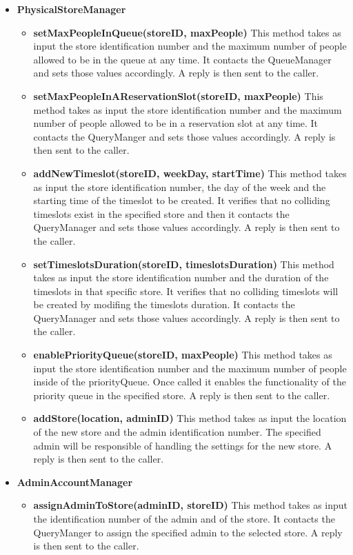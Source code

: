 \begin{itemize}
    \item \textbf{PhysicalStoreManager}
    \begin{itemize}
        \item \textbf{setMaxPeopleInQueue(storeID, maxPeople)}
        This method takes as input the store identification number and the maximum number of people allowed to be in the queue at any time. It contacts the QueueManager and sets those values accordingly. A reply is then sent to the caller. 
        \item \textbf{setMaxPeopleInAReservationSlot(storeID, maxPeople)}
        This method takes as input the store identification number and the maximum number of people allowed to be in a reservation slot at any time. It contacts the QueryManger and sets those values accordingly. A reply is then sent to the caller. 
        \item \textbf{addNewTimeslot(storeID, weekDay, startTime)}
        This method takes as input the store identification number, the day of the week and the starting time of the timeslot to be created. It verifies that no colliding timeslots exist in the specified store and then it contacts the QueryManager and sets those values accordingly. A reply is then sent to the caller.
        \item \textbf{setTimeslotsDuration(storeID, timeslotsDuration)}
        This method takes as input the store identification number and the duration of the timeslots in that specific store. It verifies that no colliding timeslots will be created by modifing the timeslots duration. It contacts the QueryManager and sets those values accordingly. A reply is then sent to the caller.
        \item \textbf{enablePriorityQueue(storeID, maxPeople)}
        This method takes as input the store identification number and the maximum number of people inside of the priorityQueue. Once called it enables the functionality of the priority queue in the specified store. A reply is then sent to the caller.
        \item \textbf{addStore(location, adminID)}
        This method takes as input the location of the new store and the admin identification number. The specified admin will be responsible of handling the settings for the new store. 
        A reply is then sent to the caller. 
    \end{itemize}

    \item \textbf{AdminAccountManager}
    \begin{itemize}
        \item \textbf{assignAdminToStore(adminID, storeID)}
        This method takes as input the identification number of the admin and of the store. It contacts the QueryManger to assign the specified admin to the selected store. A reply is then sent to the caller. 
    \end{itemize}
    

\end{itemize}
